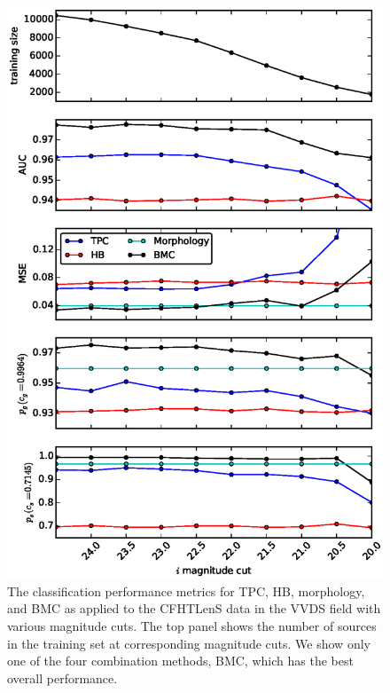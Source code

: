 \documentclass[useAMS,usenatbib]{mn2e}
\begin{document}
\begin{figure}
  \begin{minipage}[t]{0.49\linewidth}
    \includegraphics[width=\textwidth]{figures/perform_mag_cut.eps}
    \caption{The classification performance metrics for TPC, HB, morphology,
      and BMC as applied to the CFHTLenS data in the VVDS field
      with various magnitude cuts.
      The top panel shows the number of sources in the training set
      at corresponding magnitude cuts.
      We show only one of the four combination methods, BMC,
      which has the best overall performance.}
    \label{fig:perform_mag_cut}
  \end{minipage}
  \hfill
  \begin{minipage}[t]{0.49\linewidth}

\end{minipage}
\end{figure}
\end{document}
